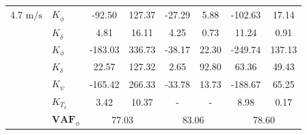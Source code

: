 \begin{table}[]
\begin{tabular}{llcccccc}
    4.7 $\si{\meter\per\second}$ & $K_{\dot{\phi}} $     & -92.50                                     & 127.37                                             & -27.29                                     & 5.88                                               & -102.63                                    & 17.14                                              \\
                                 & $K_{\dot{\delta}}$    & 4.81                                       & 16.11                                              & 4.25                                       & 0.73                                               & 11.24                                      & 0.91                                               \\
                                 & $K_{\phi} $           & -183.03                                    & 336.73                                             & -38.17                                     & 22.30                                              & -249.74                                    & 137.13                                             \\
                                 & $K_\delta $           & 22.57                                      & 127.32                                             & 2.65                                       & 92.80                                              & 63.36                                      & 49.43                                              \\
                                 & $K_\psi $             & -165.42                                    & 266.33                                             & -33.78                                     & 13.73                                              & -188.67                                    & 65.25                                              \\
                                 & $K_{T_\delta}$        & 3.42                                       & 10.37                                              & -                                          & -                                                  & 8.98                                       & 0.17                                               \\ \cline{2-8} 
                                 & $\mathbf{VAF}_\phi$   & \multicolumn{2}{c}{77.03}                                                                       & \multicolumn{2}{c}{83.06}                                                                       & \multicolumn{2}{c}{78.60}                                                                       \\

\end{tabular}
\end{table}
